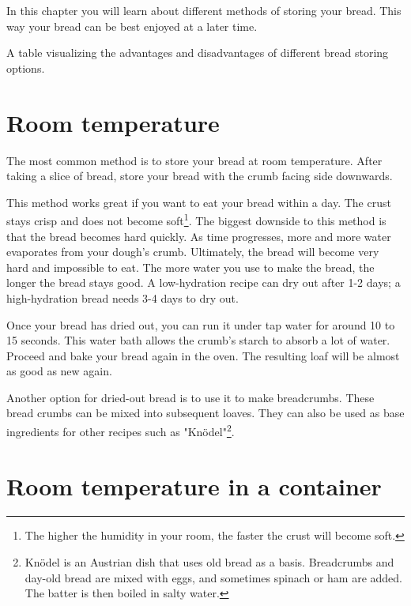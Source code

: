 In this chapter you will learn about different
methods of storing your bread. This way
your bread can be best enjoyed at a later
time.

\begin{table}[!htb]
    \begin{center}
        
        \caption{A table visualizing the advantages and disadvantages
        of different bread storing options.}
        \label{table:bread-storage}
    \end{center}
\end{table}

\section{Room temperature}

The most common method is to store your bread
at room temperature. After taking a slice of bread,
store your bread with the crumb facing side
downwards.

This method works great if you want to eat
your bread within a day. The crust stays
crisp and does not become soft\footnote{The higher the humidity in your room,
    the faster the crust will become soft.}.
The biggest downside to this method is that
the bread becomes hard quickly. As time progresses,
more and more water evaporates from your dough's
crumb. Ultimately, the bread will become very hard
and impossible to eat. The more water you use
to make the bread, the longer the bread stays good.
A low-hydration recipe can dry out after 1-2 days;
a high-hydration bread needs 3-4 days to dry out.

Once your bread has dried out, you can run it under
tap water for around 10 to 15 seconds.
This water bath allows the
crumb's starch to absorb a lot of water. Proceed and
bake your bread again in the oven. The resulting loaf
will be almost as good as new again.

Another option for dried-out bread is to use it
to make breadcrumbs. These bread crumbs can be mixed
into subsequent loaves. They can also be used as
base ingredients for other recipes such as "Knödel"\footnote{Knödel is an
    Austrian dish that uses old bread as a basis.
  Breadcrumbs and day-old bread are mixed with eggs, and sometimes
  spinach or ham are added. The batter is then boiled in salty water.
}.

\section{Room temperature in a container}

